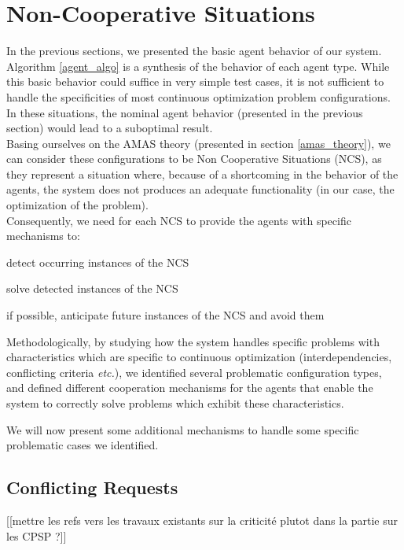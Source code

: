 \section{Non-Cooperative Situations}\label{NCS_pres}

In the previous sections, we presented the basic agent behavior of our system. Algorithm \ref{agent_algo} is a synthesis of the behavior of each agent type. While this basic behavior could suffice in very simple test cases, it is not sufficient to handle the specificities of most continuous optimization problem configurations. In these situations, the nominal agent behavior (presented in the previous section) would lead to a suboptimal result.\\
Basing ourselves on the AMAS theory (presented in section \ref{amas_theory}), we can consider these configurations to be Non Cooperative Situations (NCS), as they represent a situation where, because of a shortcoming in the behavior of the agents, the system does not produces an adequate functionality (in our case, the optimization of the problem).\\
Consequently, we need for each NCS to provide the agents with specific mechanisms to:
\begin{compactenum}
\item detect occurring instances of the NCS
\item solve detected instances of the NCS
\item if possible, anticipate future instances of the NCS and avoid them
\end{compactenum}

Methodologically, by studying how the system handles specific problems with characteristics which are specific to continuous optimization (interdependencies, conflicting criteria \emph{etc.}), we identified several problematic configuration types, and defined different cooperation mechanisms for the agents that enable the system to correctly solve problems which exhibit these characteristics.

We will now present some additional mechanisms to handle some specific problematic cases we identified.

\subsection{Conflicting Requests}

[[mettre les refs vers les travaux existants sur la criticité plutot dans la partie sur les CPSP ?]]

